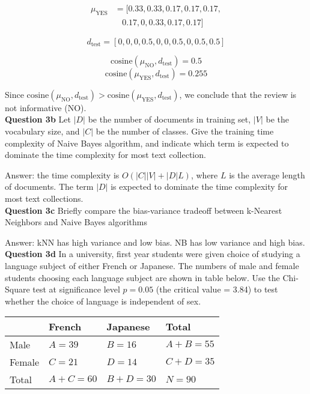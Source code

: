 \documentclass[11pt,a4paper]{report}
\begin{document}
\begin{multicols*}{2}
\begin{equation*}
\begin{split}
\mu_{\text{YES}} &= [0.33, 0.33, 0.17, 0.17, 0.17, \\
&\ \ \ \ 0.17, 0, 0.33, 0.17, 0.17]
\end{split}
\end{equation*}

$$d_{\text{test}} = [0,0,0,0.5,0,0,0.5,0,0.5,0.5]$$

$$\text{cosine}(\mu_{\text{NO}}, d_{\text{test}}) = 0.5$$
$$\text{cosine}(\mu_{\text{YES}}, d_{\text{test}}) = 0.255$$

\noindent Since $\text{cosine}(\mu_{\text{NO}}, d_{\text{test}}) > \text{cosine}(\mu_{\text{YES}}, d_{\text{test}})$, we conclude that the review is not informative (NO). \\

\noindent \textbf{Question 3b} Let $|D|$ be the number of documents in training set, $|V|$ be the vocabulary size, and $|C|$ be the number of classes. Give the training time complexity of Naive Bayes algorithm, and indicate which term is expected to dominate the time complexity for most text collection.

\noindent Answer: the time complexity is $O(|C||V|+|D|L)$, where $L$ is the average length of documents. The term $|D|$ is expected to dominate the time complexity for most text collections. \\

\noindent \textbf{Question 3c} Briefly compare the bias-variance tradeoff between k-Nearest Neighbors and Naive Bayes algorithms

\noindent Answer: kNN has high variance and low bias. NB has low variance and high bias.\\

\noindent \textbf{Question 3d} In a university, first year students were given choice of studying a language subject of either French or Japanese. The numbers of male and female students choosing each language subject are shown in table below. Use the Chi-Square test at significance level $p=0.05$ (the critical value = 3.84) to test whether the choice of language is independent of sex.

\scriptsize
\begin{center}
\begin{tabular}{ |l|l|l|l| } 
    \hline
            & French     & Japanese   & Total \\
    \hline 
    Male    & $A = 39$   & $B = 16$   & $A+B=55$ \\
    Female  & $C = 21$   & $D = 14$   & $C+D=35$ \\
    Total   & $A+C = 60$ & $B+D = 30$ & $N=90$ \\
    \hline
\end{tabular}
\end{center}
\normalsize


\end{multicols*}
\end{document}
